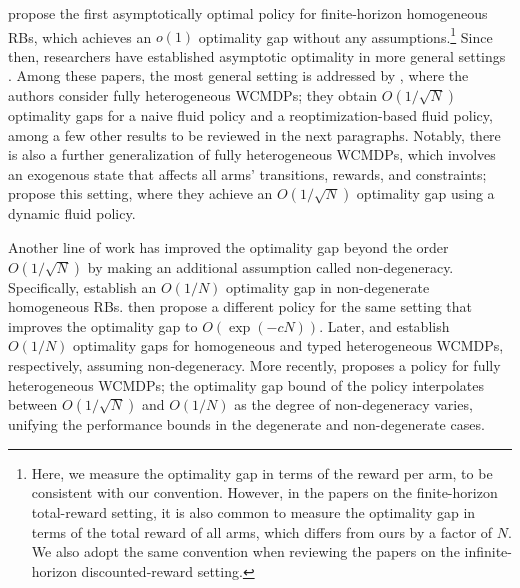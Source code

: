 \documentclass{article}
\theoremstyle{plain}
\theoremstyle{remark}
\begin{document}
\citet{HuFra_17_rb_asymptotic} propose the first asymptotically optimal policy for finite-horizon homogeneous RBs, which achieves an $o(1)$ optimality gap without any assumptions.\footnote{Here, we measure the optimality gap in terms of the reward per arm, to be consistent with our convention. However, in the papers on the finite-horizon total-reward setting, it is also common to measure the optimality gap in terms of the total reward of all arms, which differs from ours by a factor of $N$. We also adopt the same convention when reviewing the papers on the infinite-horizon discounted-reward setting.}
Since then, researchers have established asymptotic optimality in more general settings \citep{ZayJasWan_19_rb,DaeChoGri_23,GhoNagJaiTam_23_finite_discount,BroSmi_19_rb,BroZha_23}.
Among these papers, the most general setting is addressed by \citet{BroZha_23}, where the authors consider fully heterogeneous WCMDPs; they obtain $O(1/\sqrt{N})$ optimality gaps for a naive fluid policy and a reoptimization-based fluid policy, among a few other results to be reviewed in the next paragraphs.
Notably, there is also a further generalization of fully heterogeneous WCMDPs, which involves an exogenous state that affects all arms' transitions, rewards, and constraints; \citet{BroZha_22} propose this setting, where they achieve an $O(1/\sqrt{N})$ optimality gap using a dynamic fluid policy.

Another line of work has improved the optimality gap beyond the order $O(1/\sqrt{N})$ by making an additional assumption called non-degeneracy. Specifically, \citet{ZhaFra_21} establish an $O(1/N)$ optimality gap in non-degenerate homogeneous RBs. \citet{GasGauYan_23_exponential} then propose a different policy for the same setting that improves the optimality gap to $O(\exp(-cN))$.
Later, \citet{GasGauYan_24_reopt} and \citet{BroZha_23} establish $O(1/N)$ optimality gaps for homogeneous and typed heterogeneous WCMDPs, respectively, assuming non-degeneracy.
More recently, \citet{Zhang24_het} proposes a policy for fully heterogeneous WCMDPs; the optimality gap bound of the policy interpolates between $O(1/\sqrt{N})$ and $O(1/N)$ as the degree of non-degeneracy varies, unifying the performance bounds in the degenerate and non-degenerate cases.
\end{document}
